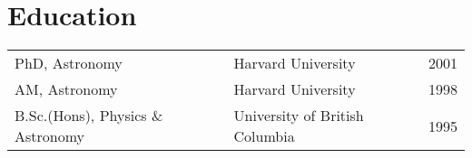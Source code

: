 \documentclass[12pt]{article}
\begin{document}
\maketitle

\section{Education}
\begin{tabular}{lll}
PhD, Astronomy & Harvard University & 2001\\
AM, Astronomy & Harvard University & 1998\\
B.Sc.(Hons),  Physics \& Astronomy & University of British Columbia&1995\\
\end{tabular}


\begin{publications}

\printbibliography[title={Submitted refereed publications},keyword=submit]


\printbibliography[title={Refereed publications},keyword=ref]

\setcounter{papers}{0}
\printbibliography[title={Conference presentations},keyword=unref]


\end{publications}
\end{document}
